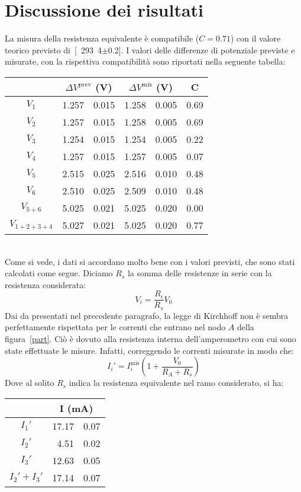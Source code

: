 \documentclass[italian,a4paper]{article}
\begin{document}
\section{Discussione dei risultati}
La misura della resistenza equivalente è compatibile ($C = 0.71$) con il valore teorico previsto di~\unit[293.4$\pm$0.2]{\ohm}. I valori delle differenze di potenziale previste e misurate, con la rispettiva compatibilità sono riportati nella seguente tabella:
\begin{table}[h]
\centering
 \begin{tabular}{c r@{ $\pm$ }l r@{ $\pm$ }l c}
 &\multicolumn{2}{c}{$\Delta V^{\text{prev}}$ (\unit{V})} &\multicolumn{2}{c}{$\Delta V^{\text{mis}}$ (\unit{V})}& C\\\hline
$V_1$ &1.257 &0.015 &1.258 &0.005 & 0.69\\
$V_2$ &1.257 &0.015 &1.258 &0.005 & 0.69\\
$V_3$ &1.254 &0.015 &1.254 &0.005 & 0.22\\
$V_4$ &1.257 &0.015 &1.257 &0.005 & 0.07\\
$V_5$ &2.515 &0.025 &2.516 &0.010 & 0.48\\
$V_6$ &2.510 &0.025 &2.509 &0.010 & 0.48\\
$V_{5+6}$ &5.025 &0.021 &5.025 &0.020 & 0.00\\
$V_{1+2+3+4}$ &5.027 &0.021 &5.025 &0.020 & 0.77\\
\end{tabular}
\end{table}\\
Come si vede, i dati si accordano molto bene con i valori previsti, che sono stati calcolati come segue. Diciamo $R_s$ la somma delle resistenze in serie con la resistenza considerata:
\begin{equation*}
 V_i = \dfrac{R_i}{R_s}V_0
\end{equation*}
Dai da presentati nel precedente paragrafo, la legge di Kirchhoff non è sembra perfettamente rispettata per le correnti che entrano nel nodo $A$ della figura~\ref{part}. Ciò è dovuto alla resistenza interna dell'amperometro con cui sono state effettuate le misure. Infatti, correggendo le correnti misurate in modo che:
\begin{equation*}
 I_i' =  I_i^{\text{mis}}\left(1+\dfrac{V_0}{R_A+R_s}\right)
\end{equation*}
Dove al solito $R_s$ indica la resistenza equivalente nel ramo considerato, si ha:
\begin{table}[h]
\centering
 \begin{tabular}{c r@{ $\pm$ }l}
 &\multicolumn{2}{c}{I (\unit{mA})}\\\hline
$I_1'$ &17.17 &0.07\\
$I_2'$ &4.51 &0.02\\
$I_3'$ &12.63&0.05\\\hline
$I_2'+I_3'$ &17.14&0.07 \\
 \end{tabular}
\end{table}\\
\end{document}
